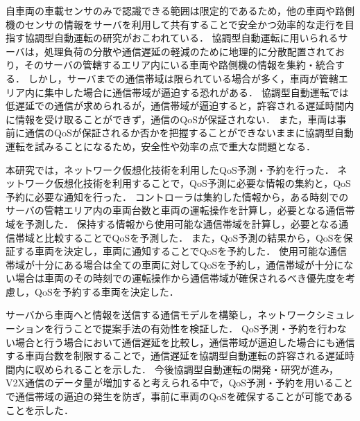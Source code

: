 \documentclass[a4paper,11pt,uplatex]{ujreport}
\begin{document}

  自車両の車載センサのみで認識できる範囲は限定的であるため，他の車両や路側機のセンサの情報をサーバを利用して共有することで安全かつ効率的な走行を目指す協調型自動運転の研究がおこわれている．
  協調型自動運転に用いられるサーバは，処理負荷の分散や通信遅延の軽減のために地理的に分散配置されており，そのサーバの管轄するエリア内にいる車両や路側機の情報を集約・統合する．
  しかし，サーバまでの通信帯域は限られている場合が多く，車両が管轄エリア内に集中した場合に通信帯域が逼迫する恐れがある．
  協調型自動運転では低遅延での通信が求められるが，通信帯域が逼迫すると，許容される遅延時間内に情報を受け取ることができず，通信のQoSが保証されない．
  また，車両は事前に通信のQoSが保証されるか否かを把握することができないままに協調型自動運転を試みることになるため，安全性や効率の点で重大な問題となる．\par
  本研究では，ネットワーク仮想化技術を利用したQoS予測・予約を行った．
  ネットワーク仮想化技術を利用することで，QoS予測に必要な情報の集約と，QoS予約に必要な通知を行った．
  コントローラは集約した情報から，ある時刻でのサーバの管轄エリア内の車両台数と車両の運転操作を計算し，必要となる通信帯域を予測した．
  保持する情報から使用可能な通信帯域を計算し，必要となる通信帯域と比較することでQoSを予測した．
  また，QoS予測の結果から，QoSを保証する車両を決定し，車両に通知することでQoSを予約した．
  使用可能な通信帯域が十分にある場合は全ての車両に対してQoSを予約し，通信帯域が十分にない場合は車両のその時刻での運転操作から通信帯域が確保されるべき優先度を考慮し，QoSを予約する車両を決定した．\par
  サーバから車両へと情報を送信する通信モデルを構築し，ネットワークシミュレーションを行うことで提案手法の有効性を検証した．
  QoS予測・予約を行わない場合と行う場合において通信遅延を比較し，通信帯域が逼迫した場合にも通信する車両台数を制限することで，通信遅延を協調型自動運転の許容される遅延時間内に収められることを示した．
  今後協調型自動運転の開発・研究が進み，V2X通信のデータ量が増加すると考えられる中で，QoS予測・予約を用いることで通信帯域の逼迫の発生を防ぎ，事前に車両のQoSを確保することが可能であることを示した．

\end{document}
